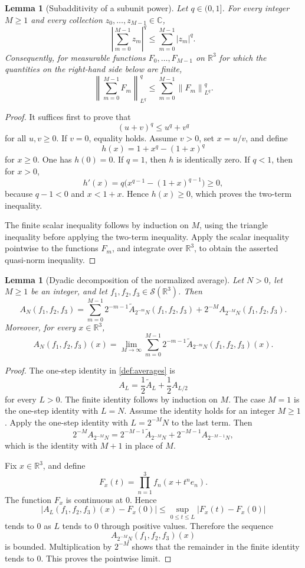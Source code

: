 \documentclass[11pt]{article}
\newtheorem{lemma}[theorem]{Lemma}
\newcommand{\R}{\mathbb{R}}
\newcommand{\Cplx}{\mathbb{C}}
\newcommand{\Sch}{\mathcal{S}}
\newcommand{\norm}[2]{\left\lVert #1\right\rVert_{#2}}
\newcommand{\abs}[1]{\left|#1\right|}
\begin{document}
\begin{lemma}[Subadditivity of a subunit power]\label{lem:subunit-power}
Let \(q\in(0,1]\).  For every integer \(M\geq1\) and every collection \(z_0,\ldots,z_{M-1}\in\Cplx\),
\[
\abs{\sum_{m=0}^{M-1}z_m}^{q}
\leq
\sum_{m=0}^{M-1}\abs{z_m}^{q}.
\]
Consequently, for measurable functions \(F_0,\ldots,F_{M-1}\) on \(\R^3\) for which the quantities on the right-hand side below are finite,
\[
\norm{\sum_{m=0}^{M-1}F_m}{L^q}^{q}
\leq
\sum_{m=0}^{M-1}\norm{F_m}{L^q}^{q}.
\]
\end{lemma}

\begin{proof}
It suffices first to prove that
\[
(u+v)^q\leq u^q+v^q
\]
for all \(u,v\geq0\).  If \(v=0\), equality holds.  Assume \(v>0\), set \(x=u/v\), and define
\[
h(x)=1+x^q-(1+x)^q
\]
for \(x\geq0\).  One has \(h(0)=0\).  If \(q=1\), then \(h\) is identically zero.  If \(q<1\), then for \(x>0\),
\[
h'(x)=q\bigl(x^{q-1}-(1+x)^{q-1}\bigr)\geq0,
\]
because \(q-1<0\) and \(x<1+x\).  Hence \(h(x)\geq0\), which proves the two-term inequality.

The finite scalar inequality follows by induction on \(M\), using the triangle inequality before applying the two-term inequality.  Apply the scalar inequality pointwise to the functions \(F_m\), and integrate over \(\R^3\), to obtain the asserted quasi-norm inequality.
\end{proof}

\begin{lemma}[Dyadic decomposition of the normalized average]\label{lem:dyadic-decomposition}
Let \(N>0\), let \(M\geq1\) be an integer, and let \(f_1,f_2,f_3\in\Sch(\R^3)\).  Then
\[
A_N(f_1,f_2,f_3)
=
\sum_{m=0}^{M-1}2^{-m-1}\widetilde A_{2^{-m}N}(f_1,f_2,f_3)
+
2^{-M}A_{2^{-M}N}(f_1,f_2,f_3).
\]
Moreover, for every \(x\in\R^3\),
\[
A_N(f_1,f_2,f_3)(x)
=
\lim_{M\to\infty}
\sum_{m=0}^{M-1}2^{-m-1}\widetilde A_{2^{-m}N}(f_1,f_2,f_3)(x).
\]
\end{lemma}

\begin{proof}
The one-step identity in \cref{def:averages} is
\[
A_L
=
\frac12\widetilde A_L+\frac12A_{L/2}
\]
for every \(L>0\).  The finite identity follows by induction on \(M\).  The case \(M=1\) is the one-step identity with \(L=N\).  Assume the identity holds for an integer \(M\geq1\).  Apply the one-step identity with \(L=2^{-M}N\) to the last term.  Then
\[
2^{-M}A_{2^{-M}N}
=
2^{-M-1}\widetilde A_{2^{-M}N}
+
2^{-M-1}A_{2^{-M-1}N},
\]
which is the identity with \(M+1\) in place of \(M\).

Fix \(x\in\R^3\), and define
\[
F_x(t)=\prod_{n=1}^{3}f_n(x+t^n e_n).
\]
The function \(F_x\) is continuous at \(0\).  Hence
\[
\abs{A_L(f_1,f_2,f_3)(x)-F_x(0)}
\leq
\sup_{0\leq t\leq L}\abs{F_x(t)-F_x(0)}
\]
tends to \(0\) as \(L\) tends to \(0\) through positive values.  Therefore the sequence
\[
A_{2^{-M}N}(f_1,f_2,f_3)(x)
\]
is bounded.  Multiplication by \(2^{-M}\) shows that the remainder in the finite identity tends to \(0\).  This proves the pointwise limit.
\end{proof}
\end{document}
